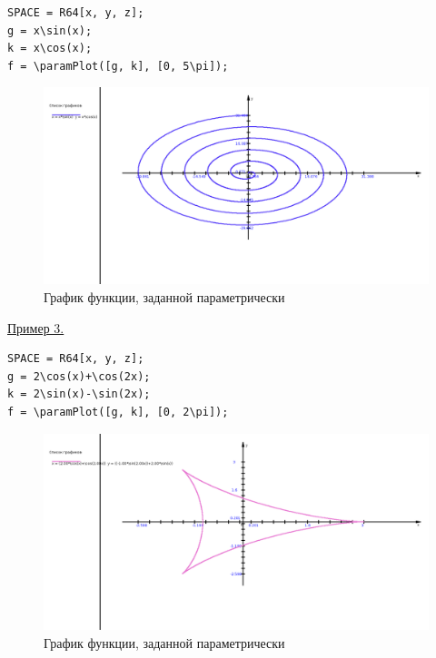 \vspace*{-2mm}
\begin{verbatim}
SPACE = R64[x, y, z];
g = x\sin(x);
k = x\cos(x);
f = \paramPlot([g, k], [0, 5\pi]);
\end{verbatim}
\vspace*{-2mm}

\begin{figure}[h!]
 \includegraphics[scale=0.3]{pictures/2_2}
\vspace*{-10mm}
\caption{График функции, заданной параметрически}
\label{2_2}
\end{figure}



\underline{Пример 3. }


\vspace*{-2mm}
\begin{verbatim}
SPACE = R64[x, y, z];
g = 2\cos(x)+\cos(2x); 
k = 2\sin(x)-\sin(2x);
f = \paramPlot([g, k], [0, 2\pi]);
\end{verbatim}
\vspace*{-2mm}

\begin{figure}[h!]
 \includegraphics[scale=0.3]{pictures/2_3}
\vspace*{-10mm}
\caption{График функции, заданной параметрически}
\label{2_3}
\end{figure}

